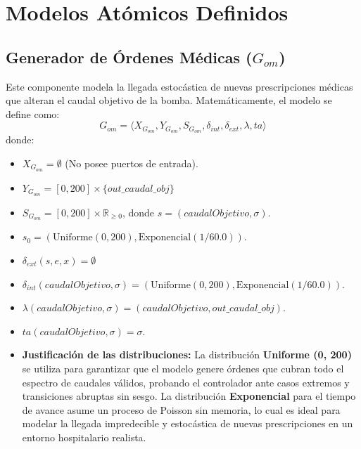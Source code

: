 \section{Modelos Atómicos Definidos}

\subsection{Generador de Órdenes Médicas ($G_{om}$)}
Este componente modela la llegada estocástica de nuevas prescripciones médicas que alteran el caudal objetivo de la bomba.
Matemáticamente, el modelo se define como:
\[ G_{om} = \langle X_{G_{om}}, Y_{G_{om}}, S_{G_{om}}, \delta_{int}, \delta_{ext}, \lambda, ta \rangle \]
donde:
\begin{itemize}
    \item $X_{G_{om}} = \emptyset$ (No posee puertos de entrada).
    \item $Y_{G_{om}} = [0, 200] \times \{out\_caudal\_obj\}$
    \item $S_{G_{om}} = [0, 200] \times \mathbb{R}_{\geq 0}$, donde $s = (caudalObjetivo, \sigma)$.
    \item $s_0 = (\text{Uniforme}(0, 200), \text{Exponencial}(1 / 60.0))$.
    \item $\delta_{ext}(s, e, x) = \emptyset$
    \item \(\delta_{int}(caudalObjetivo, \sigma) = (\text{Uniforme}(0, 200), \text{Exponencial}(1 / 60.0))\).
    \item \(\lambda(caudalObjetivo, \sigma) = (caudalObjetivo, out\_caudal\_obj)\).
    \item \(ta(caudalObjetivo, \sigma) = \sigma\).
    \item \textbf{Justificación de las distribuciones:} La distribución \textbf{Uniforme (0, 200)} se utiliza para garantizar que el modelo genere órdenes que cubran todo el espectro de caudales válidos, probando el controlador ante casos extremos y transiciones abruptas sin sesgo. La distribución \textbf{Exponencial} para el tiempo de avance asume un proceso de Poisson sin memoria, lo cual es ideal para modelar la llegada impredecible y estocástica de nuevas prescripciones en un entorno hospitalario realista.
\end{itemize}

